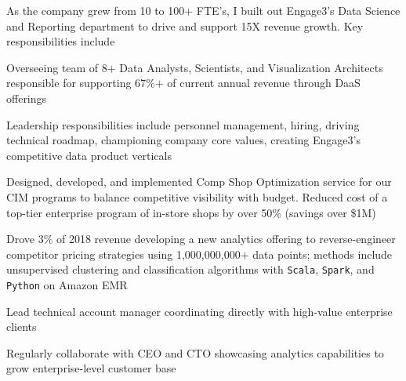 \documentclass[]{deedy-resume-openfont}
\begin{document}
As the company grew from 10 to 100+ FTE's, I built out Engage3's Data Science and Reporting department to drive and support 15X revenue growth. %
Key responsibilities include
\begin{tightemize}
\item Overseeing team of 8+ Data Analysts, Scientists, and Visualization Architects responsible for supporting 67\%+ of current annual revenue through DaaS offerings
\item Leadership responsibilities include personnel management, hiring, driving technical roadmap, championing company core values, creating Engage3's competitive data product verticals
\item Designed, developed, and implemented Comp Shop Optimization service for our CIM programs to balance competitive visibility with budget.  Reduced cost of a top-tier enterprise program of in-store shops by over 50\% (savings over \$1M)
\item Drove 3\% of 2018 revenue developing a new analytics offering to reverse-engineer competitor pricing strategies using 1,000,000,000+ data points; methods include unsupervised clustering and classification algorithms with \verb|Scala|, \verb|Spark|, and \verb|Python| on Amazon EMR
\item Lead technical account manager coordinating directly with high-value enterprise clients
\item Regularly collaborate with CEO and CTO showcasing analytics capabilities to grow enterprise-level customer base
\end{tightemize}

\sectionsep
\end{document}
